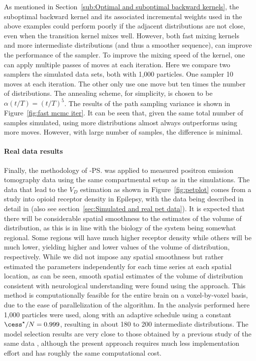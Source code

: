 As mentioned in Section~\ref{sub:Optimal and suboptimal backward kernels}, the suboptimal backward kernel and its associated incremental weights used in the above examples could perform poorly if the adjacent distributions are not close, even when the transition kernel mixes well. However, both fast mixing kernels and more intermediate distributions (and thus a smoother sequence), can improve the performance of the sampler. To improve the mixing speed of the kernel, one can apply multiple passes of \mcmc moves at each iteration. Here we compare two samplers  the simulated data sets, both with 1,000 particles. One sampler  10 \mcmc moves at each iteration. The other only use one \mcmc move but ten times the number of distributions. The annealing scheme, for simplicity, is chosen to be $\alpha(t/T) = (t/T)^5$. The results of the path sampling variance is shown in Figure~\ref{fig:fast mcmc iter}. It can be seen that, given the same total number of samples simulated, using more distributions almost always outperforms using more \mcmc moves. However, with  large number of samples, the difference is minimal.



\paragraph{Real data results}

Finally, the methodology of \smc[2]-\ps was applied to measured positron emission tomography data using the same compartmental setup as in the simulations. The data that lead to the $V_D$ estimation as shown in Figure~\ref{fig:petplot} comes from a study into opioid receptor density in Epilepsy, with the data being described in detail in \cite{Jiang:2009kf} (also see section~\ref{sec:Simulated and real pet data}). It is expected that there will be considerable spatial smoothness to the estimates of the volume of distribution, as this is in line with the biology of the system being somewhat regional. Some regions will have much higher receptor density while others will be much lower, yielding higher and lower values of the volume of distribution, respectively. While we did not impose any spatial smoothness but rather estimated the parameters independently for each time series at each spatial location, as can be seen, smooth spatial estimates of the volume of distribution consistent with neurological understanding were found using the approach. This method is computationally feasible for the entire brain on a voxel-by-voxel basis, due to the ease of parallelization of the \smc algorithm. In the analysis performed here 1,000 particles were used, along with an adaptive schedule using a constant $\cess^\star/N = 0.999$, resulting in about 180 to 200 intermediate distributions. The model selection results are very close to those obtained by a previous study of the same data \cite{Zhou2013}, although the present approach requires much less implementation effort and has roughly the same computational cost.

